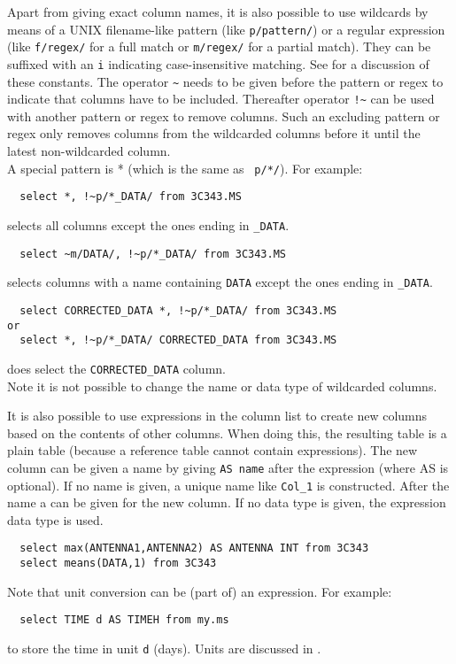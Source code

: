Apart from giving exact column names, it is also possible to use
wildcards by means of a UNIX filename-like pattern (like \texttt{p/pattern/})
or a regular expression (like \texttt{f/regex/} for a full match or
\texttt{m/regex/} for a partial match). They can be suffixed with an
\texttt{i} indicating case-insensitive matching.
See  for a discussion of these constants.
The operator \verb+~+ needs to be given before the pattern or regex
to indicate that columns have to be included. Thereafter operator
\verb+!~+ can be used with another pattern or regex to remove columns.
Such an excluding pattern or regex only removes columns from the
wildcarded columns before it until the latest non-wildcarded column.
\\A special pattern is * (which is the same as \texttt{~p/*/}).
 For example:
\begin{verbatim}
  select *, !~p/*_DATA/ from 3C343.MS
\end{verbatim}
selects all columns except the ones ending in \texttt{\_DATA}.
\begin{verbatim}
  select ~m/DATA/, !~p/*_DATA/ from 3C343.MS
\end{verbatim}
selects columns with a name containing \texttt{DATA} except the ones
ending in \texttt{\_DATA}.
\begin{verbatim}
  select CORRECTED_DATA *, !~p/*_DATA/ from 3C343.MS
or
  select *, !~p/*_DATA/ CORRECTED_DATA from 3C343.MS
\end{verbatim}
does select the \texttt{CORRECTED\_DATA} column.
\\Note it is not possible to change the name or data type of
wildcarded columns.

It is also possible to use expressions in the column list to create
new columns based on the contents of other columns. When doing this,
the resulting table is a plain table (because a reference table
cannot contain expressions). The new column can be given a name
by giving \texttt{AS name} after the expression (where AS is
optional). If no name is given, a unique name like
\texttt{Col\_1} is constructed.
After the name a  can
be given for the new column. If no data type is given, the expression
data type is used.
\begin{verbatim}
  select max(ANTENNA1,ANTENNA2) AS ANTENNA INT from 3C343
  select means(DATA,1) from 3C343
\end{verbatim}
Note that unit conversion can be (part of) an expression. For example:
\begin{verbatim}
  select TIME d AS TIMEH from my.ms
\end{verbatim}
to store the time in unit \texttt{d} (days). Units are discussed in
.

